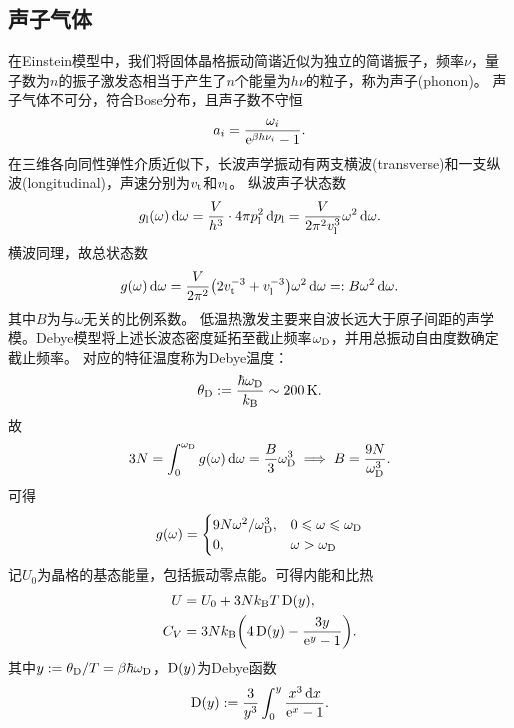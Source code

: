 \subsection{声子气体}

在Einstein模型中，我们将固体晶格振动简谐近似为独立的简谐振子，频率$\nu$，量子数为$n$的振子激发态相当于产生了$n$个能量为$h\nu$的粒子，称为声子(phonon)。
声子气体不可分，符合Bose分布，且声子数不守恒
\[
	a_i = \frac{\omega_i}{\mathop{}\!\mathrm{e}^{\beta h\nu_i} - 1}.
\]
在三维各向同性弹性介质近似下，长波声学振动有两支横波(transverse)和一支纵波(longitudinal)，声速分别为$v_\mathrm t$和$v_\mathrm l$。
纵波声子状态数
\[
	g_\mathrm l(\omega)\mathop{}\!\mathrm{d}\omega = \frac V{h^3} \cdot 4\pi p_\mathrm l^2\mathop{}\!\mathrm{d} p_\mathrm l = \frac V{2\pi^2v_\mathrm l^3}\omega^2\mathop{}\!\mathrm{d}\omega.
\]
横波同理，故总状态数
\[
	g(\omega)\mathop{}\!\mathrm{d}\omega = \frac V{2\pi^2}\bigl(2v_\mathrm t^{-3} + v_\mathrm l^{-3}\bigr)\omega^2\mathop{}\!\mathrm{d}\omega =: B\omega^2\mathop{}\!\mathrm{d}\omega.
\]
其中$B$为与$\omega$无关的比例系数。
低温热激发主要来自波长远大于原子间距的声学模。Debye模型将上述长波态密度延拓至截止频率$\omega_\mathrm D$，并用总振动自由度数确定截止频率。
对应的特征温度称为Debye温度：
\begin{equation}
	\label{eq:sm-debye-temperature}
	\theta_\mathrm D := \frac{\hbar\omega_\mathrm D}{k_{\mathrm{B}}} \sim \qty{200}{\kelvin}.
\end{equation}
故
\[
	3N = \int_0^{\omega_\mathrm D}g(\omega)\mathop{}\!\mathrm{d}\omega = \frac B3\omega_\mathrm D^3 \implies B = \frac{9N}{\omega_\mathrm D^3}.
\]
可得
\begin{equation}
	\label{eq:sm-debye-density-of-states}
	g(\omega) = \begin{cases}
		9N\omega^2/\omega_\mathrm D^3,&0 \leqslant \omega \leqslant \omega_\mathrm D\\
		0,&\omega > \omega_\mathrm D
	\end{cases}
\end{equation}
记$U_0$为晶格的基态能量，包括振动零点能。可得内能和比热
\begin{subequations}
	\begin{align}
		U &= U_0 + 3Nk_{\mathrm{B}} T\operatorname{D}(y),\\
		C_V &= 3Nk_{\mathrm{B}}\biggl(4\operatorname{D}(y) - \frac{3y}{\mathop{}\!\mathrm{e}^y - 1}\biggr).
	\end{align}
\end{subequations}
其中$y := \theta_\mathrm D/T = \beta\hbar\omega_\mathrm D$，$\operatorname{D}(y)$为Debye函数
\begin{equation}
	\label{eq:sm-debye-function}
	\operatorname{D}(y) := \frac 3{y^3}\int_0^{y}\frac{x^3\mathop{}\!\mathrm{d} x}{\mathop{}\!\mathrm{e}^x - 1}.
\end{equation}
